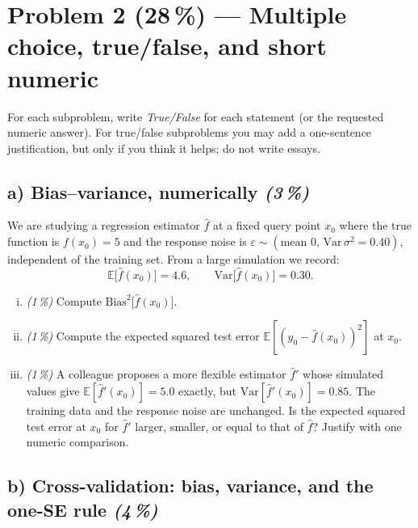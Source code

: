 \documentclass[11pt,a4paper]{article}
\newcommand{\points}[1]{\textbf{(#1\,\%)}}
\newcommand{\subpoints}[1]{\textit{(#1\,\%)}}
\begin{document}
\vfill\eject

\section*{Problem 2 \points{28} --- Multiple choice, true/false, and short numeric}

For each subproblem, write \emph{True/False} for each statement (or the requested numeric answer). For true/false subproblems you may add a one-sentence justification, but only if you think it helps; do not write essays.

\subsection*{a) Bias--variance, numerically \subpoints{3}}
We are studying a regression estimator $\hat f$ at a fixed query point $x_0$ where the true function is $f(x_0) = 5$ and the response noise is $\varepsilon \sim (\text{mean }0,\, \mathrm{Var}\,\sigma^2 = 0.40)$, independent of the training set. From a large simulation we record:
$$\mathbb{E}\bigl[\hat f(x_0)\bigr] = 4.6, \qquad \mathrm{Var}\bigl[\hat f(x_0)\bigr] = 0.30.$$

\begin{enumerate}[(i)]
  \item \subpoints{1} Compute $\mathrm{Bias}^2\!\bigl[\hat f(x_0)\bigr]$.
  \item \subpoints{1} Compute the expected squared test error $\mathbb{E}[(y_0 - \hat f(x_0))^2]$ at $x_0$.
  \item \subpoints{1} A colleague proposes a more flexible estimator $\hat f'$ whose simulated values give $\mathbb{E}[\hat f'(x_0)] = 5.0$ exactly, but $\mathrm{Var}[\hat f'(x_0)] = 0.85$. The training data and the response noise are unchanged. Is the expected squared test error at $x_0$ for $\hat f'$ larger, smaller, or equal to that of $\hat f$? Justify with one numeric comparison.
\end{enumerate}

\subsection*{b) Cross-validation: bias, variance, and the one-SE rule \subpoints{4}}
\end{document}
